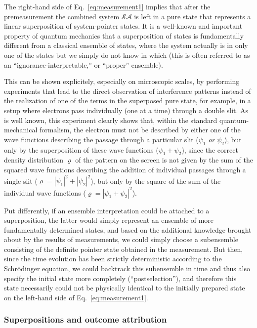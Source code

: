\documentclass[twocolumn,rmp,aps,amsmath,amsfonts,noshowkeys,noshowpacs]{revtex4}
\begin{document}
The right-hand side of Eq.~\eqref{eq:measurement1} implies that after
the premeasurement the combined system $\mathcal{SA}$ is left in a
pure state that represents a linear superposition of system-pointer
states. It is a well-known and important property of quantum mechanics
that a superposition of states is fundamentally different from a
classical ensemble of states, where the system actually is in only one
of the states but we simply do not know in which (this is often
referred to as an ``ignorance-interpretable,'' or ``proper''
ensemble).

This can be shown explicitely, especially on microscopic scales, by
performing experiments that lead to the direct observation of
interference patterns instead of the realization of one of the terms
in the superposed pure state, for example, in a setup where electrons
pass individually (one at a time) through a double slit. As is
well known, this experiment clearly shows that, within the standard
quantum-mechanical formalism, the electron must not be described by
either one of the wave functions describing the passage through
a particular slit ($\psi_1$ \emph{or} $\psi_2$), but only by the
superposition of these wave functions ($\psi_1+\psi_2$), since the
correct density distribution $\varrho$ of the pattern on the screen is
not given by the sum of the squared wave functions describing the
addition of individual passages through a single slit ($\varrho =
|\psi_1|^2 + |\psi_2|^2$), but only by the square of the sum of the
individual wave functions ($\varrho = |\psi_1 + \psi_2|^2$).

Put differently, if an ensemble interpretation could be attached to a
superposition, the latter would simply represent an ensemble of more
fundamentally determined states, and based on the additional knowledge
brought about by the results of measurements, we could simply choose a
subensemble consisting of the definite pointer state obtained in the
measurement. But then, since the time evolution has been strictly
deterministic according to the Schr\"odinger equation, we could
backtrack this subensemble in time and thus also specify the
initial state more completely (``postselection''), and
therefore this state necessarily could not be physically identical to
the initially prepared state on the left-hand side of
Eq.~\eqref{eq:measurement1}.


\subsubsection{Superpositions and outcome attribution}
\end{document}
